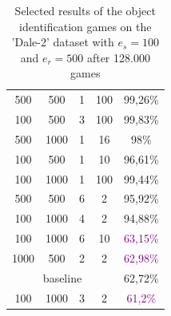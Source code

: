 \begin{table}[ht]
\begin{tabular}{cccc|c}
        {500}                         & {500}     & {1} & {100} & {99,26\%}                           \\
        {100}                         & {500}     & {3} & {100} & {99,83\%}                           \\
        {500}                         & {1000}    & {1} & {16}  & {98\%}                              \\
        {100}                         & {500}     & {1} & {10}  & {96,61\%}                           \\
        {100}                         & {1000}    & {1} & {100} & {99,44\%}                           \\
        {500}                         & {500}     & {6} & {2}   & {95,92\%}                           \\
        {100}                         & {1000}    & {4} & {2}   & {94,88\%}                           \\
        {100}                         & {1000}    & {6} & {10}  & \textcolor{purple}{63,15\%}         \\
        {1000}                        & {500}     & {2} & {2}   & \textcolor{purple}{62,98\%}         \\\midrule
        \multicolumn{4}{c|}{baseline} & {62,72\%}                                                     \\\midrule
        {100}                         & {1000}    & {3} & {2}   & \textcolor{purple}{61,2\%}          \\
        \bottomrule
    \end{tabular}
    \caption{Selected results of the object identification games on the 'Dale-2' dataset with $e_s=100$ and $e_r=500$ after 128.000 games}
    \label{tab:results_discriminator_dale-2}
\end{table}

